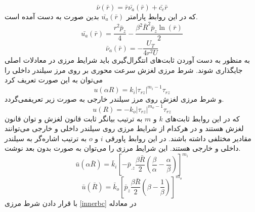 \begin{equation}
	\label{nuC}
	\bar{\nu}(\bar{r}) = \bar{r}\bar{\nu_a}(\bar{r}) + \bar{c_c}\bar{r}
\end{equation}
که در این روابط پارامتر $\bar{u_a}(\bar{r})$ بدین صورت به دست آمده است.
\begin{equation}
	\label{uwithc}
	\bar{u_a}(\bar{r}) = \frac{r^{2} \bar{p}_{z}}{4}-\frac{\beta^{2} \bar{R}^{2} \bar{p}_{z} \ln (\bar{r})}{2}
\end{equation}
\begin{equation}
	\label{nuwithc}
	\bar{\nu}_a(\bar{r})=-\frac{U_{T}}{4 r^{2} U}
\end{equation}
به منظور به دست آوردن ثابت‌های انتگرال‌گیری باید شرایط مرزی در معادلات اصلی جایگذاری شوند.
شرط مرزی لغزش سرعت محوری بر روی مرز سیلندر داخلی را می‌توان به این صورت تعریف کرد
\begin{equation}
	u(\alpha R)=k_{i}\left|\tau_{r z}\right|^{m_{i}-1} \tau_{r z}
\end{equation}
و شرط مرزی لغزش روی مرز سیلندر خارجی به صورت زیر تعریفمی‌گردد.
\begin{equation}
	u(R)=-k_{o}\left|\tau_{r z}\right|^{m_{o}-1} \tau_{r z}
\end{equation}
که در این روابط ثابت‌های $k$ و $m$ به ترتیب بیانگر ثابت قانون لغزش و توان قانون لغزش هستند و در هرکدام از شرایط مرزی روی سیلندر داخلی و خارجی می‌توانند مقادیر مختلفی داشته باشند. در این روابط پاورقی $i$ و $o$ به ترتیب اشاره‌گر به سیلندر داخلی و خارجی هستند. این شرایط مرزی را می‌توان به صورت بدون بعد نوشت.
\begin{equation}
	\label{innerbc}
		\bar{u}(\alpha \bar{R})=\bar{k}_{i}\left[-\bar{p}_{. z} \frac{\beta \bar{R}}{2}\left(\frac{\beta}{\alpha}-\frac{\alpha}{\beta}\right)\right]^{m_{i}}
\end{equation}
\begin{equation}
	\label{outerbc}
		\bar{u}(\bar{R})=\bar{k}_{o}\left[\bar{p}_{z} \frac{\beta \bar{R}}{2}\left(\beta-\frac{1}{\beta}\right)\right]^{m_{o}}
\end{equation}
با قرار دادن شرط مرزی
\ref{innerbc}
در معادله 
